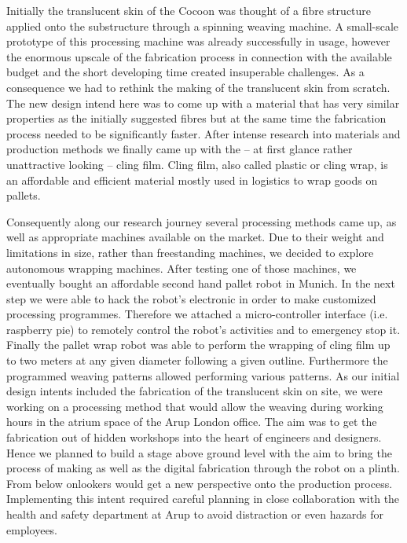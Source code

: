 Initially the translucent skin of the Cocoon was thought of a fibre structure applied onto the substructure through a spinning weaving machine. A small-scale prototype of this processing machine was already successfully in usage, however the enormous upscale of the fabrication process in connection with the available budget and the short developing time created insuperable challenges. As a consequence we had to rethink the making of the translucent skin from scratch. The new design intend here was to come up with a material that has very similar properties as the initially suggested fibres but at the same time the fabrication process needed to be significantly faster. After intense research into materials and production methods we finally came up with the – at first glance rather unattractive looking – cling film. Cling film, also called plastic or cling wrap, is an affordable and efficient material mostly used in logistics to wrap goods on pallets.

Consequently along our research journey several processing methods came up, as well as appropriate machines available on the market. Due to their weight and limitations in size, rather than freestanding machines, we decided to explore autonomous wrapping machines. After testing one of those machines, we eventually bought an affordable second hand pallet robot in Munich. In the next step we were able to hack the robot’s electronic in order to make customized processing programmes. Therefore we attached a micro-controller interface (i.e. raspberry pie) to remotely control the robot’s activities and to emergency stop it. Finally the pallet wrap robot was able to perform the wrapping of cling film up to two meters at any given diameter following a given outline. Furthermore the programmed weaving patterns allowed performing various patterns. 
As our initial design intents included the fabrication of the translucent skin on site, we were working on a processing method that would allow the weaving during working hours in the atrium space of the Arup London office. The aim was to get the fabrication out of hidden workshops into the heart of engineers and designers. Hence we planned to build a stage above ground level with the aim to bring the process of making as well as the digital fabrication through the robot on a plinth. From below onlookers would get a new perspective onto the production process. Implementing this intent required careful planning in close collaboration with the health and safety department at Arup to avoid distraction or even hazards for employees.

